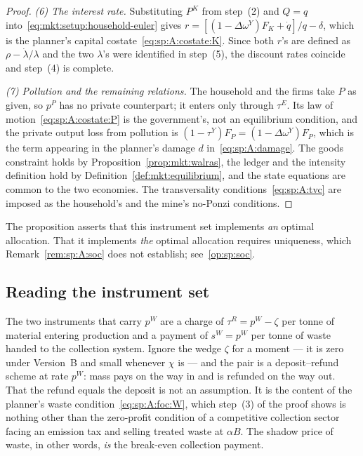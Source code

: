 \begin{proof}
\emph{(6) The interest rate.} Substituting $P^K$ from step~(2) and $Q=q$
into~\eqref{eq:mkt:setup:household-euler} gives
$r=\left[\left(1-\Delta\omega^Y\right)F_K+\dot q\right]/q-\delta$, which is the planner's capital
costate~\eqref{eq:sp:A:costate:K}. Since both $r$'s are defined as $\rho-\dot\lambda/\lambda$ and the
two $\lambda$'s were identified in step~(5), the discount rates coincide and step~(4) is complete.

\emph{(7) Pollution and the remaining relations.} The household and the firms take $P$ as given, so
$p^P$ has no private counterpart; it enters only through $\tau^E$. Its
law of motion~\eqref{eq:sp:A:costate:P} is the government's, not an equilibrium condition, and the
private output loss from pollution is $\left(1-\tau^Y\right)F_P=\left(1-\Delta\omega^Y\right)F_P$,
which is the term appearing in the planner's damage $d$
in~\eqref{eq:sp:A:damage}. The goods constraint holds by Proposition~\ref{prop:mkt:walras}, the
ledger and the intensity definition hold by Definition~\ref{def:mkt:equilibrium}, and the state
equations are common to the two economies. The transversality
conditions~\eqref{eq:sp:A:tvc} are imposed as the household's and the mine's no-Ponzi conditions.
\end{proof}

The proposition asserts that this instrument set implements \emph{an} optimal allocation. That it
implements \emph{the} optimal allocation requires uniqueness, which Remark~\ref{rem:sp:A:soc} does not
establish; see~\ref{op:sp:soc}.


\subsection{Reading the instrument set}\label{sec:mkt:A:reading}

 The two instruments that carry $p^W$ are
a charge of $\tau^R=p^W-\zeta$ per tonne of material entering production and a payment of $s^W=p^W$ per
tonne of waste handed to the collection system. Ignore the wedge $\zeta$ for a moment --- it is zero
under Version~B and small whenever $\chi$ is --- and the pair is a deposit--refund scheme at rate
$p^W$: mass pays on the way in and is refunded on the way out. That the refund equals the deposit is
not an assumption. It is the content of the planner's waste condition~\eqref{eq:sp:A:foc:W}, which
step~(3) of the proof shows is nothing other than the zero-profit condition of a competitive collection
sector facing an emission tax and selling treated waste at $\alpha B$. The shadow price of
waste, in other words, \emph{is} the break-even collection payment.

